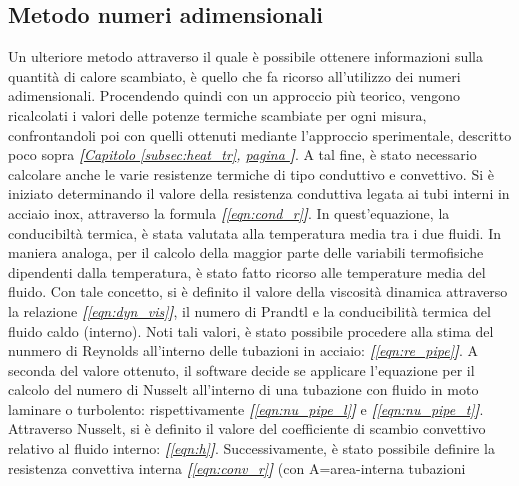 \documentclass[a4paper,10pt]{article}                                                                                       %
\begin{document}
\subsection{Metodo numeri adimensionali}                                                                                    %
\label{subsec:adimnum_meth}                                                                                                 %
  Un ulteriore metodo attraverso il quale è possibile ottenere informazioni sulla quantità di calore scambiato, è quello
  che fa ricorso all'utilizzo dei numeri adimensionali. Procendendo quindi con un approccio più teorico, vengono
  ricalcolati i valori delle potenze termiche scambiate per ogni misura, confrontandoli poi con quelli ottenuti mediante
  l'approccio sperimentale, descritto poco sopra \textit{\textbf{[}\hyperref[subsec:heat_tr]{Capitolo }\ref{subsec:heat_tr},
  \hyperref[subsec:heat_tr]{pagina }\pageref{subsec:heat_tr}\textbf{]}}. A tal fine, è stato necessario calcolare anche le
  varie resistenze termiche di tipo conduttivo e convettivo. Si è iniziato determinando il valore della resistenza
  conduttiva legata ai tubi interni in acciaio inox, attraverso la formula \textit{\textbf{[}\ref{eqn:cond_r}\textbf{]}}.
  In quest'equazione, la conducibiltà termica, è stata valutata alla temperatura media tra i due fluidi. In maniera
  analoga, per il calcolo della maggior parte delle variabili termofisiche dipendenti dalla temperatura, è stato fatto
  ricorso alle temperature media del fluido. Con tale concetto, si è definito il valore della viscosità dinamica attraverso
  la relazione \textit{\textbf{[}\ref{eqn:dyn_vis}\textbf{]}}, il numero di Prandtl e la conducibilità termica del fluido
  caldo (interno). Noti tali valori, è stato possibile procedere alla stima del nunmero di Reynolds all'interno delle
  tubazioni in acciaio: \textit{\textbf{[}\ref{eqn:re_pipe}\textbf{]}}. A seconda del valore ottenuto, il software decide
  se applicare l'equazione per il calcolo del numero di Nusselt all'interno di una tubazione con fluido in moto laminare
  o turbolento: rispettivamente \textit{\textbf{[}\ref{eqn:nu_pipe_l}\textbf{]}} e
  \textit{\textbf{[}\ref{eqn:nu_pipe_t}\textbf{]}}. Attraverso Nusselt, si è definito il valore del coefficiente di scambio
  convettivo relativo al fluido interno: \textit{\textbf{[}\ref{eqn:h}\textbf{]}}. Successivamente, è stato possibile
  definire la resistenza convettiva interna \textit{\textbf{[}\ref{eqn:conv_r}\textbf{]}} (con A=area-interna tubazioni
\end{document}
